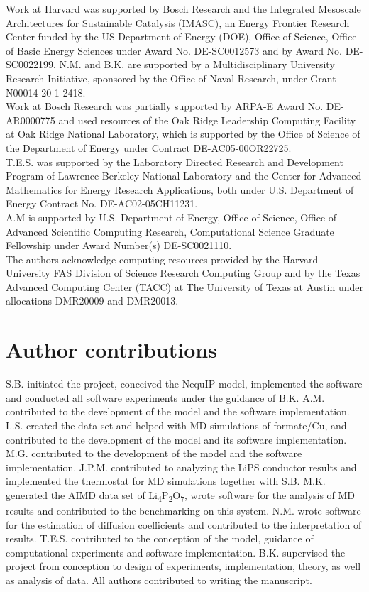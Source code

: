 \documentclass[%
reprint,
superscriptaddress,
nofootinbib,
amsmath,amssymb,
aps,
prl,
]{revtex4-1}
\begin{document}
Work at Harvard was supported by Bosch Research and the Integrated Mesoscale Architectures for Sustainable Catalysis (IMASC), an Energy Frontier Research Center funded by the US Department of Energy (DOE), Office of Science, Office of Basic Energy Sciences under Award No. DE-SC0012573 and by Award No. DE-SC0022199. N.M. and B.K. are supported by a Multidisciplinary	University Research Initiative,	 sponsored	 by	 the Office	 of	 Naval	 Research, under Grant	 N00014-20-1-2418.\\

Work at Bosch Research was partially supported by ARPA-E Award No. DE-AR0000775 and used resources of the Oak Ridge Leadership Computing Facility at Oak Ridge National Laboratory, which is supported by the Office of Science of the Department of Energy under Contract DE-AC05-00OR22725.\\

T.E.S. was supported by the Laboratory Directed Research and Development Program of Lawrence Berkeley National Laboratory and the Center for Advanced Mathematics for Energy Research Applications, both under U.S. Department of Energy Contract No. DE-AC02-05CH11231.\\

A.M is supported by U.S. Department of Energy, Office of Science, Office of Advanced Scientific Computing Research, Computational Science Graduate Fellowship under Award Number(s) DE-SC0021110. \\

The authors acknowledge computing resources provided by the Harvard University FAS Division of Science Research Computing Group and by the Texas Advanced Computing Center (TACC) at The University of Texas at Austin under allocations DMR20009 and DMR20013.

\section{Author contributions}

S.B. initiated the project, conceived the NequIP model, implemented the software and conducted all software experiments under the guidance of B.K. A.M. contributed to the development of the model and the software implementation. L.S. created the data set and helped with MD simulations of formate/Cu, and contributed to the development of the model and its software implementation. M.G. contributed to the development of the model and the software implementation. J.P.M. contributed to analyzing the LiPS conductor results and implemented the thermostat for MD simulations together with S.B. M.K. generated the AIMD data set of Li\textsubscript{4}P\textsubscript{2}O\textsubscript{7}, wrote software for the analysis of MD results and contributed to the benchmarking on this system. N.M. wrote software for the estimation of diffusion coefficients and contributed to the interpretation of results. T.E.S. contributed to the conception of the model, guidance of computational experiments and software implementation. B.K. supervised the project from conception to design of experiments, implementation, theory, as well as analysis of data. All authors contributed to writing the manuscript. 
\end{document}
